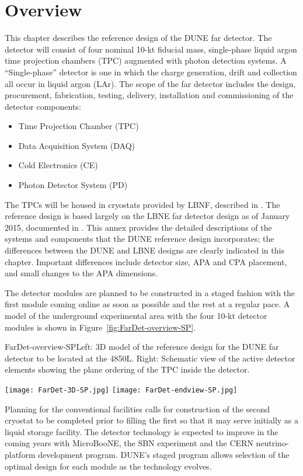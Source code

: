 \section{Overview}
\label{sec:detectors-fd-ref-ov}


This chapter describes the reference design of the DUNE far detector.
The detector will consist of four nominal 10-kt fiducial mass,
single-phase liquid argon time projection chambers (TPC) augmented
with photon detection systems.  A ``Single-phase'' detector is one in
which the charge generation, drift and collection all occur in liquid
argon (LAr). The scope of the far detector includes the design,
procurement, fabrication, testing, delivery, installation and
commissioning of the detector components:
\begin{itemize}
\item Time Projection Chamber (TPC)
\item Data Acquisition System (DAQ)  
\item Cold Electronics (CE)
\item Photon Detector System (PD)
\end{itemize}
The TPCs will be housed in cryostats provided by LBNF, described in
\vollbnf. The reference design is based largely on the LBNE far
detector design as of January 2015, documented in \anxlbnefd. This
annex provides the detailed descriptions of the systems and components
that the DUNE reference design incorporates; the differences between
the DUNE and LBNE designs are clearly indicated in this
chapter. Important differences include detector size, APA and CPA
placement, and small changes to the APA dimensions.


The detector modules are planned to be constructed in a staged fashion
with the first module coming online as soon as possible and the rest
at a regular pace. A model of the underground experimental area with
the four 10-kt detector modules is shown in
Figure~\ref{fig:FarDet-overview-SP}. 
\begin{cdrfigure}{FarDet-overview-SP}{Left: 3D model of the reference design for the DUNE far detector to be located at the 4850L. Right: Schematic view of the active detector elements showing the plane ordering of the TPC inside the detector.}
\centering
\begin{minipage}[b]{1.0\textwidth}
\begin{center}
\texttt{[image: FarDet-3D-SP.jpg]}
\texttt{[image: FarDet-endview-SP.jpg]}
\end{center}
\end{minipage}
\end{cdrfigure}
Planning for the conventional facilities calls for construction of the
second cryostat to be completed prior to filling the first so that it
may serve initially as a liquid storage facility.  The detector
technology is expected to improve in the coming years with MicroBooNE,
the SBN experiment and the CERN neutrino-platform development
program. DUNE's staged program allows selection of the optimal design
for each module as the technology evolves.  %


